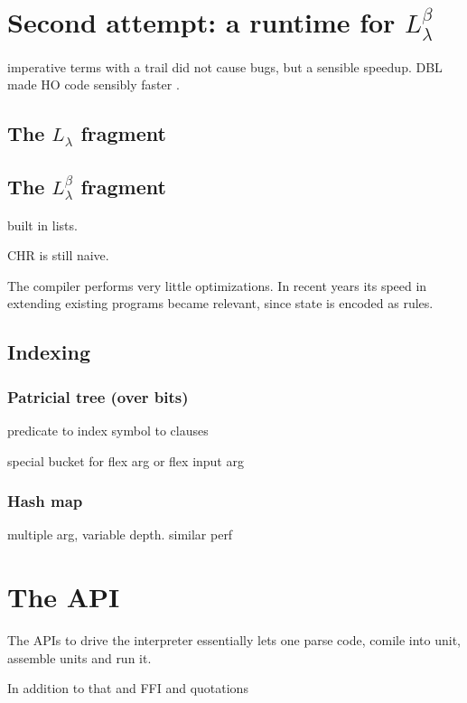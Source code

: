 \documentclass[a4paper, 11pt]{book}
\begin{document}
\section{Second attempt: a runtime for $L_{\lambda}^{\beta}$}

imperative terms with a trail did not cause bugs, but a sensible speedup.
DBL made HO code sensibly faster \cite{dunchev15lpar}.

\subsection{The $L_{\lambda}$ fragment}
\subsection{The $L_{\lambda}^{\beta}$ fragment}

\cite{Michaylov1993HigherOrderLP}

built in lists.

CHR is still naive.

The compiler performs very little optimizations. In recent years its speed
in extending existing programs became relevant, since state is encoded as rules.

\subsection{Indexing}
\subsubsection{Patricial tree (over bits)}

predicate to index
symbol to clauses

special bucket for flex arg or flex input arg

\subsubsection{Hash map}

multiple arg, variable depth. similar perf


\section{The API}\label{sec:API}

The APIs to drive the interpreter essentially lets one parse code, comile into
unit, assemble units and run it.

In addition to that and FFI and quotations
\end{document}
